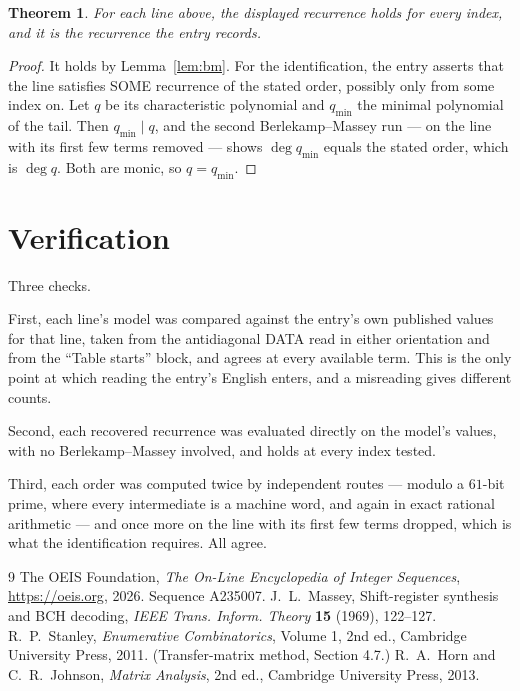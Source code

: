 \documentclass[11pt,a4paper]{article}
\theoremstyle{plain}
\newtheorem{theorem}{Theorem}
\theoremstyle{definition}
\begin{document}
\begin{theorem}
For each line above, the displayed recurrence holds for every index, and it is the recurrence
the entry records.
\end{theorem}

\begin{proof}
It holds by Lemma~\ref{lem:bm}. For the identification, the entry asserts that the line
satisfies SOME recurrence of the stated order, possibly only from some index on. Let $q$ be its
characteristic polynomial and $q_{\min}$ the minimal polynomial of the tail. Then
$q_{\min}\mid q$, and the second Berlekamp--Massey run --- on the line with its first few
terms removed --- shows $\deg q_{\min}$ equals the stated order, which is $\deg q$. Both are
monic, so $q=q_{\min}$.
\end{proof}

\section{Verification}

Three checks.

First, each line's model was compared against the entry's own published values for that line,
taken from the antidiagonal DATA read in either orientation and from the ``Table starts''
block, and agrees at every available term. This is the only point at which reading the entry's
English enters, and a misreading gives different counts.

Second, each recovered recurrence was evaluated directly on the model's values, with no
Berlekamp--Massey involved, and holds at every index tested.

Third, each order was computed twice by independent routes --- modulo a $61$-bit prime, where
every intermediate is a machine word, and again in exact rational arithmetic --- and once more
on the line with its first few terms dropped, which is what the identification requires. All
agree.

\begin{thebibliography}{9}
 The OEIS Foundation, \emph{The On-Line Encyclopedia of Integer
Sequences}, \url{https://oeis.org}, 2026. Sequence A235007.
 J.~L.~Massey, Shift-register synthesis and BCH decoding, \emph{IEEE
Trans. Inform. Theory} \textbf{15} (1969), 122--127.
 R.~P.~Stanley, \emph{Enumerative Combinatorics}, Volume 1, 2nd ed.,
Cambridge University Press, 2011. (Transfer-matrix method, Section 4.7.)
 R.~A.~Horn and C.~R.~Johnson, \emph{Matrix Analysis}, 2nd ed., Cambridge
University Press, 2013.
\end{thebibliography}
\end{document}
